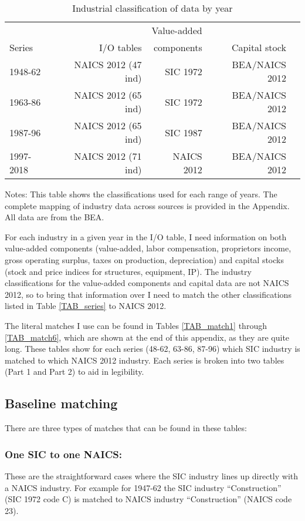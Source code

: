 \documentclass[11pt]{article}
\begin{document}
\begin{table}[!htb]
\begin{center}
\label{TAB_series_app}
\caption{Industrial classification of data by year}
\begin{tabular}{lrrrr}
\midrule
	    &             & Value-added   & \\
Series  & I/O tables  & components & Capital stock \\ 
\midrule
1948-62 & NAICS 2012 (47 ind) & SIC 1972 & BEA/NAICS 2012 \\
1963-86 & NAICS 2012 (65 ind) & SIC 1972 & BEA/NAICS 2012 \\
1987-96 & NAICS 2012 (65 ind) & SIC 1987 & BEA/NAICS 2012 \\
1997-2018 & NAICS 2012 (71 ind) & NAICS 2012 & BEA/NAICS 2012 \\ 
\midrule
\end{tabular}
\end{center}
{\footnotesize Notes: This table shows the classifications used for each range of years. The complete mapping of industry data across sources is provided in the Appendix. All data are from the BEA. }
\end{table}

For each industry in a given year in the I/O table, I need information on both value-added components (value-added, labor compensation, proprietors income, gross operating surplus, taxes on production, depreciation) and capital stocks (stock and price indices for structures, equipment, IP). The industry classifications for the value-added components and capital data are not NAICS 2012, so to bring that information over I need to match the other classifications listed in Table \ref{TAB_series} to NAICS 2012. 

The literal matches I use can be found in Tables \ref{TAB_match1} through \ref{TAB_match6}, which are shown at the end of this appendix, as they are quite long. These tables show for each series (48-62, 63-86, 87-96) which SIC industry is matched to which NAICS 2012 industry. Each series is broken into two tables (Part 1 and Part 2) to aid in legibility. 

\subsection{Baseline matching}
There are three types of matches that can be found in these tables:

\subsubsection{One SIC to one NAICS:} These are the straightforward cases where the SIC industry lines up directly with a NAICS industry. For example for 1947-62 the SIC industry ``Construction'' (SIC 1972 code C) is matched to NAICS industry ``Construction'' (NAICS code 23). 
\end{document}
